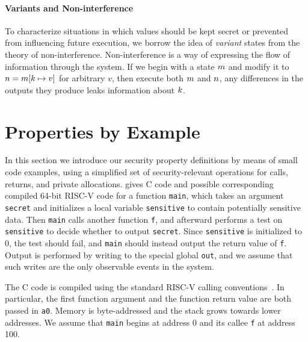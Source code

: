 \documentclass[10pt,conference]{ieeetran}%
\theoremstyle{definition}
\begin{document}
\paragraph*{Variants and Non-interference}

To characterize situations in which values should be kept secret or prevented
from influencing future execution, we borrow the idea of \emph{variant} states
from the theory of non-interference. Non-interference is a way of expressing
the flow of information through the system. If we begin with a state \(m\)
and modify it to \(n = m[k \mapsto v]\) for arbitrary \(v\),
then execute both \(m\) and \(n\), any differences in the outputs they
produce leaks information about \(k\).

\section{Properties by Example}
\label{sec:example}

In this section we introduce our security property definitions by means
of small code examples, using a simplified set of security-relevant operations for
calls, returns, and private allocations.
 gives C code and possible corresponding compiled 64-bit RISC-V code
for a function {\tt main}, which
takes an argument {\tt secret} and initializes a local variable {\tt sensitive} to contain
potentially sensitive data.
Then {\tt main} calls another function {\tt f},
and afterward performs a test on {\tt sensitive} to decide whether
to output {\tt secret}.  Since {\tt sensitive} is initialized to 0,
the test should fail, and {\tt main} should instead output the return value of {\tt f}.
Output is performed by writing to the special global {\tt out},
and we assume that such writes are the only observable events in the system.

The C code is compiled using the standard RISC-V calling conventions~\cite{RISC-V-CC}.
In particular, the first function argument and the function
return value are both passed in {\tt a0}.
Memory is byte-addressed and the stack grows towards
lower addresses. We assume that {\tt main} begins at address 0 and its callee {\tt f} at address 100.

\newcommand{\freebox}[1][10pt]{\tikz \filldraw[fill=blue] (0,0) rectangle (#1,#1);}
\newcommand{\pubbox}[1][10pt]{\tikz \filldraw[fill=lightgray] (0,0) rectangle (#1,#1);}
\newcommand{\objbox}[1][10pt]{\tikz \filldraw[fill=yellow] (0,0) rectangle (#1,#1);}
\newcommand{\sealbox}[1][10pt]{\tikz \filldraw[fill=red] (0,0) rectangle (#1,#1);}
\end{document}
